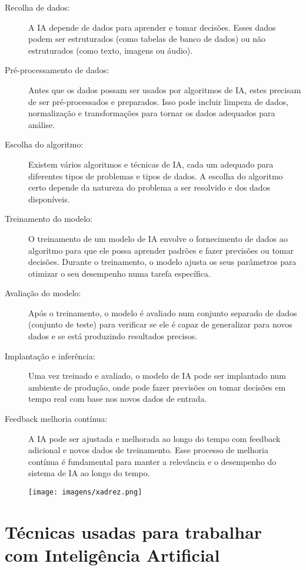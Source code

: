 \documentclass{report}
\begin{document}
\begin{description}
    \item[Recolha de dados:] A \ac{IA} depende de dados para aprender e tomar decisões. Esses dados podem ser estruturados (como tabelas de banco de dados) ou não estruturados (como texto, imagens ou áudio).
    \item[Pré-processamento de dados:] Antes que os dados possam ser usados por algoritmos de \ac{IA}, estes precisam de ser pré-processados e preparados. Isso pode incluir limpeza de dados, normalização e transformações para tornar os dados adequados para análise.
    \item[Escolha do algoritmo:] Existem vários algoritmos e técnicas de \ac{IA}, cada um adequado para diferentes tipos de problemas e tipos de dados. A escolha do algoritmo certo depende da natureza do problema a ser resolvido e dos dados disponíveis.

    \clearpage

    
    \item[Treinamento do modelo:] O treinamento de um modelo de \ac{IA} envolve o fornecimento de dados ao algoritmo para que ele possa aprender padrões e fazer previsões ou tomar decisões. Durante o treinamento, o modelo ajusta os seus parâmetros para otimizar o seu desempenho numa tarefa específica.
    \item[Avaliação do modelo:] Após o treinamento, o modelo é avaliado num conjunto separado de dados (conjunto de teste) para verificar se ele é capaz de generalizar para novos dados e se está produzindo resultados precisos.
    \item[Implantação e inferência:] Uma vez treinado e avaliado, o modelo de \ac{IA} pode ser implantado num ambiente de produção, onde pode fazer previsões ou tomar decisões em tempo real com base nos novos dados de entrada.
    \item[Feedback melhoria contínua:] A \ac{IA} pode ser ajustada e melhorada ao longo do tempo com feedback adicional e novos dados de treinamento. Esse processo de melhoria contínua é fundamental para manter a relevância e o desempenho do sistema de \ac{IA} ao longo do tempo.
\end{description}
\begin{figure}[ht]
    \centering
    \texttt{[image: imagens/xadrez.png]}
    \caption{}
    \label{fig:xadreztreinamentoai}
\end{figure}

\chapter{Técnicas usadas para trabalhar com Inteligência Artificial}
\label{chap.técnicas}
\end{document}
